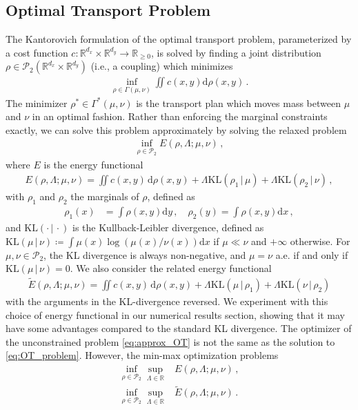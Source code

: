 \documentclass[11pt,a4paper,final]{article}
\newcommand{\KL}[2]{\text{KL}(#1\,|\,#2)}
\def\P{\mathcal P}
\def\R{\mathbb R}
\renewcommand{\d}{\mathrm{d}}
\newcommand{\1}{\mathbf{1}}
\theoremstyle{plain}
\numberwithin{equation}{section}
\numberwithin{theorem}{section}
\begin{document}
\subsection{Optimal Transport Problem}
The Kantorovich formulation of the optimal transport problem, parameterized by a cost function $c:\R^{d_x}\times \R^{d_y} \to \R_{\ge 0}$, is solved by finding a joint distribution  $\rho \in \P_2(\R^{d_x} \times \R^{d_y})$ (i.e., a coupling) which minimizes
\begin{align}\label{eq:OT_problem}
    \inf_{\rho\in\Gamma(\mu,\nu)} \iint c(x,y)\d \rho(x,y)\,.
\end{align}
The minimizer $\rho^*\in\Gamma^*(\mu, \nu)$ is the transport plan which moves mass between $\mu$ and $\nu$ in an optimal fashion. Rather than enforcing the marginal constraints exactly, we can solve this problem approximately by solving the relaxed problem
\begin{align}\label{eq:approx_OT}
    \inf_{\rho\in\P_2}   E(\rho,\Lambda; \mu,\nu) \,,
\end{align}
where $E$ is the energy functional
\begin{align*}
    E(\rho,\Lambda; \mu,\nu) = \iint c(x,y) \, \d \rho(x,y)
    + \Lambda \KL{\rho_1}{\mu} + \Lambda \KL{\rho_2}{\nu}  \,,
\end{align*}
with $\rho_1$ and $\rho_2$ the marginals of $\rho$, defined as
\begin{align*}
    \rho_1(x) &= \int \rho(x,y) \d y \,,\quad
    \rho_2(y) = \int \rho(x,y) \d x\,,
\end{align*}
and $\KL{\cdot}{\cdot}$ is the Kullback-Leibler divergence, defined as $\KL{\mu}{\nu}\coloneqq \int \mu(x) \log(\mu(x)/\nu(x)) \d x$ if $\mu\ll \nu$ and $+\infty$ otherwise. For $\mu, \nu\in \P_2$, the KL divergence is always non-negative, and $\mu=\nu$ a.e. if and only if $\KL{\mu}{\nu}=0$. We also consider the related energy functional 
\begin{align*}
    \tilde E(\rho,\Lambda;\mu,\nu)  = \iint c(x,y) \, \d \rho(x,y) 
    + \Lambda \KL{\mu}{\rho_1} + \Lambda \KL{\nu}{\rho_2} 
\end{align*}
with the arguments in the KL-divergence reversed. We experiment with this choice of energy functional in our numerical results section, showing that it may have some advantages compared to the standard KL divergence. 
The optimizer of the unconstrained problem \eqref{eq:approx_OT} is not the same as the solution to \eqref{eq:OT_problem}. However, the min-max optimization problems
\begin{align}\label{eq:min_max_OT}
    \inf_{\rho\in\P_2} \sup_{\Lambda\in\R}  &E(\rho,\Lambda; \mu,\nu)\,, \\
    \inf_{\rho\in\P_2} \sup_{\Lambda\in\R}  &\tilde E(\rho,\Lambda; \mu,\nu)\,. \label{eq:min_max_OT_nonconvex}
\end{align}
\end{document}
